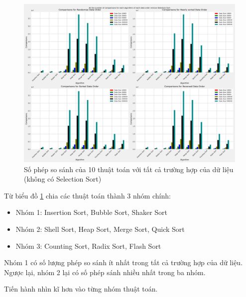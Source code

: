\begin{figure}[H]
    \centering
    \includegraphics[width=\textwidth]{experimental_result/images/all_the_number_of_comparisons_for_each_algorithm_of_each_data_order_remove_selection_sort.png}
    \caption{Số phép so sánh của 10 thuật toán với tất cả trường hợp của dữ liệu (không có Selection Sort)}
    \label{fig:all_the_number_of_comparisons_for_each_algorithm_of_each_data_order_remove_selection_sort}
\end{figure}


Từ biểu đồ \ref{fig:all_the_number_of_comparisons_for_each_algorithm_of_each_data_order_remove_selection_sort} chia các thuật toán thành 3 nhóm chính: 
\begin{itemize}
    \item Nhóm 1: Insertion Sort, Bubble Sort, Shaker Sort 
    \item Nhóm 2: Shell Sort, Heap Sort, Merge Sort, Quick Sort
    \item Nhóm 3: Counting Sort, Radix Sort, Flash Sort
\end{itemize}

Nhóm 1 có số lượng phép so sánh ít nhất trong tất cả trường hợp của dữ liệu. Ngược lại, nhóm 2 lại có số phép sánh nhiều nhất trong ba nhóm.

Tiến hành nhìn kĩ hơn vào từng nhóm thuật toán.

